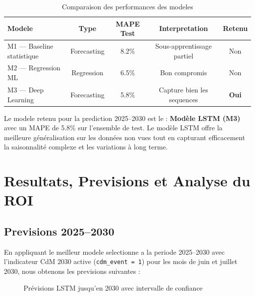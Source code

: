 \documentclass[12pt,a4paper]{report}
\begin{document}
\begin{itemize}[leftmargin=1.5em]
\begin{table}[H]
\centering\small\renewcommand{\arraystretch}{1.5}
\begin{tabular}{lcccc}
\toprule
\textbf{Modele} & \textbf{Type} & \textbf{MAPE Test}
  & \textbf{Interpretation} & \textbf{Retenu} \\
\midrule
M1 --- Baseline statistique & Forecasting & 8.2\% & Sous-apprentissage partiel & Non \\
M2 --- Regression ML & Regression  & 6.5\% & Bon compromis & Non \\
M3 --- Deep Learning & Forecasting & 5.8\% & Capture bien les sequences & \textbf{Oui} \\
\bottomrule
\end{tabular}
\caption{Comparaison des performances des modeles}
\label{tab:comparaison}
\end{table}

\begin{result_box}
Le modele retenu pour la prediction 2025--2030 est le :
\textbf{Modèle LSTM (M3)} avec un MAPE de
5.8\% sur l'ensemble de test.
Le modèle LSTM offre la meilleure généralisation sur les données non vues tout en capturant efficacement la saisonnalité complexe et les variations à long terme.
\end{result_box}

\chapter{Resultats, Previsions et Analyse du ROI}

\section{Previsions 2025--2030}

En appliquant le meilleur modele selectionne a la periode 2025--2030
avec l'indicateur CdM 2030 active (\texttt{cdm\_event = 1}) pour les
mois de juin et juillet 2030, nous obtenons les previsions suivantes :

\begin{figure}[H]
\centering
{}
\caption{Prévisions LSTM jusqu'en 2030 avec intervalle de confiance}
\end{figure}


\end{itemize}
\end{document}
